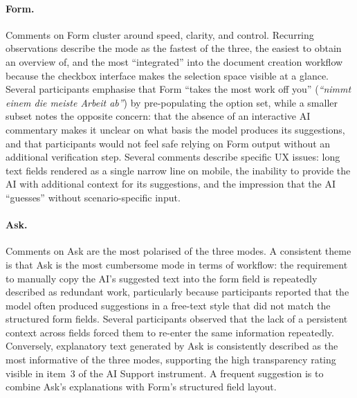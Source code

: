 \paragraph{Form.} Comments on Form cluster around speed, clarity, and
control. Recurring observations describe the mode as the fastest of the
three, the easiest to obtain an overview of, and the most ``integrated''
into the document creation workflow because the checkbox interface makes the
selection space visible at a glance. Several participants emphasise that
Form ``takes the most work off you'' (\emph{``nimmt einem die meiste Arbeit
ab''}) by pre-populating the option set, while a smaller subset notes the
opposite concern: that the absence of an interactive AI commentary makes it
unclear on what basis the model produces its suggestions, and that
participants would not feel safe relying on Form output without an additional
verification step. Several comments describe specific UX issues: long text
fields rendered as a single narrow line on mobile, the inability to provide
the AI with additional context for its suggestions, and the impression that
the AI ``guesses'' without scenario-specific input.

\paragraph{Ask.} Comments on Ask are the most polarised of the three modes.
A consistent theme is that Ask is the most cumbersome mode in terms of
workflow: the requirement to manually copy the AI's suggested text into the
form field is repeatedly described as redundant work, particularly because
participants reported that the model often produced suggestions in a
free-text style that did not match the structured form fields. Several
participants observed that the lack of a persistent context across fields
forced them to re-enter the same information repeatedly. Conversely,
explanatory text generated by Ask is consistently described as the most
informative of the three modes, supporting the high transparency rating
visible in item~3 of the AI Support instrument. A frequent suggestion is
to combine Ask's explanations with Form's structured field layout.

